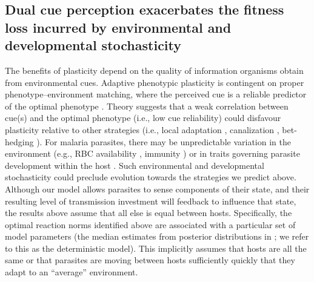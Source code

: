 \documentclass[10pt,letterpaper]{article}
\begin{document}
\subsection*{Dual cue perception exacerbates the fitness loss incurred by environmental and developmental stochasticity }
The benefits of plasticity depend on the quality of information organisms obtain from environmental cues. Adaptive phenotypic plasticity is contingent on proper phenotype–environment matching, where the perceived cue is a reliable predictor of the optimal phenotype \cite{moran_evolutionary_1992, scheiner_genetics_1998, de_jong_unpredictable_1999, schlaepfer_ecological_2002, reed_phenotypic_2010}. Theory suggests that a weak correlation between cue(s) and the optimal phenotype (i.e., low cue reliability) could disfavour plasticity relative to other strategies (i.e., local adaptation \cite{scheiner_genetics_1998, de_jong_unpredictable_1999,tufto_evolution_2000}, canalization \cite{reed_phenotypic_2010}, bet-hedging \cite{tufto_evolution_2000}). For malaria parasites, there may be unpredictable variation in the environment (e.g., RBC availability \cite{antia_dynamics_2008, birget_plasticity_2019, kamiya_uncovering_2020}, immunity \cite{haydon_top-down_2003, miller_quantitative_2010, kamiya_uncovering_2020, kamiya_linking_2021}) or in traits governing parasite development within the host \cite{kamiya_uncovering_2020}. Such environmental and developmental stochasticity could preclude evolution towards the strategies we predict above. Although our model allows parasites to sense components of their state, and their resulting level of transmission investment will feedback to influence that state, the results above assume that all else is equal between hosts. Specifically, the optimal reaction norms identified above are associated with a 
particular set of model parameters (the median estimates from posterior distributions in \cite{kamiya_uncovering_2020}; we refer to this as the deterministic model). This implicitly assumes that hosts are all the same or that parasites  are moving between hosts sufficiently quickly that they adapt to an ``average'' environment.\newline
\end{document}
